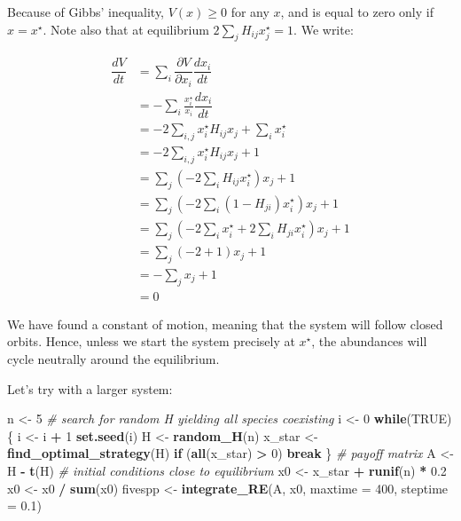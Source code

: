 \documentclass[
]{book}
\newenvironment{Shaded}{\begin{snugshade}}{\end{snugshade}}
\newcommand{\CommentTok}[1]{\textcolor[rgb]{0.56,0.35,0.01}{\textit{#1}}}
\newcommand{\ControlFlowTok}[1]{\textcolor[rgb]{0.13,0.29,0.53}{\textbf{#1}}}
\newcommand{\DataTypeTok}[1]{\textcolor[rgb]{0.13,0.29,0.53}{#1}}
\newcommand{\DecValTok}[1]{\textcolor[rgb]{0.00,0.00,0.81}{#1}}
\newcommand{\FloatTok}[1]{\textcolor[rgb]{0.00,0.00,0.81}{#1}}
\newcommand{\KeywordTok}[1]{\textcolor[rgb]{0.13,0.29,0.53}{\textbf{#1}}}
\newcommand{\NormalTok}[1]{#1}
\newcommand{\OperatorTok}[1]{\textcolor[rgb]{0.81,0.36,0.00}{\textbf{#1}}}
\newcommand{\OtherTok}[1]{\textcolor[rgb]{0.56,0.35,0.01}{#1}}
\newcommand{\StringTok}[1]{\textcolor[rgb]{0.31,0.60,0.02}{#1}}
\begin{document}
Because of Gibbs' inequality, \(V(x) \geq 0\) for any \(x\), and is equal to zero only if \(x = x^\star\). Note also that at equilibrium \(2 \sum_j H_{ij} x_j^\star = 1\). We write:

\[
\begin{aligned}
  \dfrac{d V}{d t} &= \sum_i \dfrac{\partial V}{\partial x_i}
  \dfrac{d x_i}{d t}\\
  &= - \sum_i \frac{x_i^\star}{x_i} \dfrac{d x_i}{d t} \\
  &= -2 \sum_{i,j} x_i^\star H_{ij}x_j + \sum_i x_i^\star\\
  &= -2 \sum_{i,j} x_i^\star H_{ij}x_j + 1\\
  &= \sum_j \left(-2 \sum_i H_{ij}x_i^\star \right) x_j + 1\\
  &= \sum_j \left(-2 \sum_i (1 - H_{ji}) x_i^\star \right) x_j + 1\\
  &= \sum_j \left(-2 \sum_i x_i^\star + 2 \sum_i H_{ji} x_i^\star \right) x_j
  + 1 \\
  &= \sum_j \left(-2 + 1 \right) x_j  + 1 \\
  &=- \sum_j x_j + 1\\
  &= 0 
\end{aligned}
\]

We have found a constant of motion, meaning that the system will follow closed orbits. Hence, unless we start the system precisely at \(x^\star\), the abundances will cycle neutrally around the equilibrium.

Let's try with a larger system:

\begin{Shaded}
\begin{Highlighting}[]
\NormalTok{n <-}\StringTok{ }\DecValTok{5}
\CommentTok{# search for random H yielding all species coexisting}
\NormalTok{i <-}\StringTok{ }\DecValTok{0}
\ControlFlowTok{while}\NormalTok{(}\OtherTok{TRUE}\NormalTok{)\{}
\NormalTok{  i <-}\StringTok{ }\NormalTok{i }\OperatorTok{+}\StringTok{ }\DecValTok{1}
  \KeywordTok{set.seed}\NormalTok{(i)}
\NormalTok{  H <-}\StringTok{ }\KeywordTok{random_H}\NormalTok{(n)}
\NormalTok{  x_star <-}\StringTok{ }\KeywordTok{find_optimal_strategy}\NormalTok{(H)}
  \ControlFlowTok{if}\NormalTok{ (}\KeywordTok{all}\NormalTok{(x_star) }\OperatorTok{>}\StringTok{ }\DecValTok{0}\NormalTok{) }\ControlFlowTok{break}
\NormalTok{\}}
\CommentTok{# payoff matrix}
\NormalTok{A <-}\StringTok{ }\NormalTok{H }\OperatorTok{-}\StringTok{ }\KeywordTok{t}\NormalTok{(H)}
\CommentTok{# initial conditions close to equilibrium}
\NormalTok{x0 <-}\StringTok{ }\NormalTok{x_star }\OperatorTok{+}\StringTok{ }\KeywordTok{runif}\NormalTok{(n) }\OperatorTok{*}\StringTok{ }\FloatTok{0.2}
\NormalTok{x0 <-}\StringTok{ }\NormalTok{x0 }\OperatorTok{/}\StringTok{ }\KeywordTok{sum}\NormalTok{(x0)}
\NormalTok{fivespp <-}\StringTok{ }\KeywordTok{integrate_RE}\NormalTok{(A, x0, }\DataTypeTok{maxtime =} \DecValTok{400}\NormalTok{, }\DataTypeTok{steptime =} \FloatTok{0.1}\NormalTok{)}
\end{Highlighting}
\end{Shaded}
\end{document}
